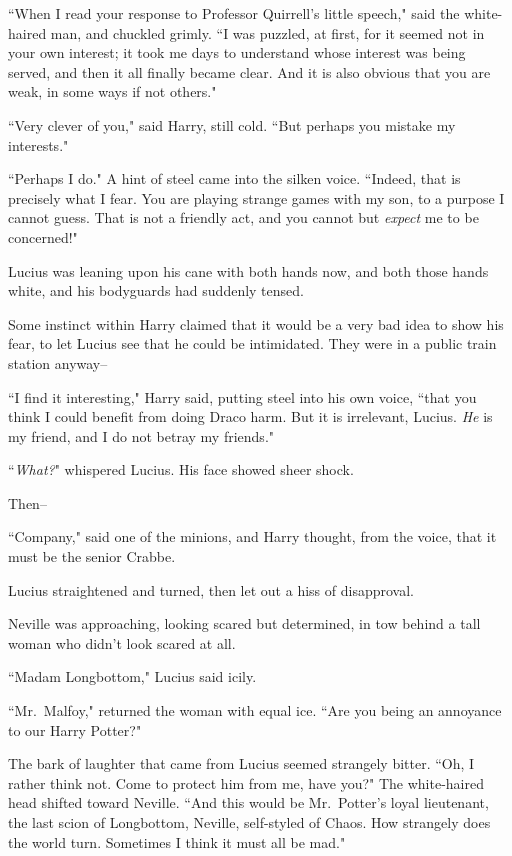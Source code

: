 ``When I read your response to Professor Quirrell's little speech," said the white-haired man, and chuckled grimly. ``I was puzzled, at first, for it seemed not in your own interest; it took me days to understand whose interest was being served, and then it all finally became clear. And it is also obvious that you are weak, in some ways if not others."

``Very clever of you," said Harry, still cold. ``But perhaps you mistake my interests."

``Perhaps I do." A hint of steel came into the silken voice. ``Indeed, that is precisely what I fear. You are playing strange games with my son, to a purpose I cannot guess. That is not a friendly act, and you cannot but \emph{expect} me to be concerned!"

Lucius was leaning upon his cane with both hands now, and both those hands white, and his bodyguards had suddenly tensed.

Some instinct within Harry claimed that it would be a very bad idea to show his fear, to let Lucius see that he could be intimidated. They were in a public train station anyway\---

``I find it interesting," Harry said, putting steel into his own voice, ``that you think I could benefit from doing Draco harm. But it is irrelevant, Lucius. \emph{He} is my friend, and I do not betray my friends."

``\emph{What?}" whispered Lucius. His face showed sheer shock.

Then\---

``Company," said one of the minions, and Harry thought, from the voice, that it must be the senior Crabbe.

Lucius straightened and turned, then let out a hiss of disapproval.

Neville was approaching, looking scared but determined, in tow behind a tall woman who didn't look scared at all.

``Madam Longbottom," Lucius said icily.

``Mr.~Malfoy," returned the woman with equal ice. ``Are you being an annoyance to our Harry Potter?"

The bark of laughter that came from Lucius seemed strangely bitter. ``Oh, I rather think not. Come to protect him from me, have you?" The white-haired head shifted toward Neville. ``And this would be Mr.~Potter's loyal lieutenant, the last scion of Longbottom, Neville, self-styled of Chaos. How strangely does the world turn. Sometimes I think it must all be mad."

